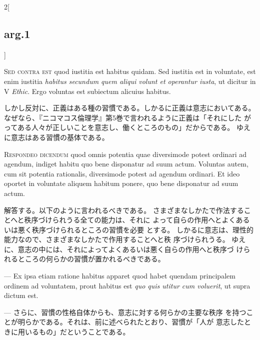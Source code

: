 \documentclass[paper=a4paper,fontsize=10pt,jafontsize=9pt,titlepage]{jlreq}
\begin{document}
\begin{paracol}{2}[\subsection{arg.1}]
\switchcolumn*[\subsection{s.c.}]

{\scshape Sed contra est} quod iustitia est habitus quidam. Sed
 iustitia est in voluntate, est enim iustitia {\itshape habitus
 secundum quem aliqui volunt et operantur iusta}, ut dicitur in V
 {\itshape Ethic}. Ergo voluntas est subiectum alicuius habitus.

\switchcolumn

しかし反対に、正義はある種の習慣である。しかるに正義は意志においてある。
 なぜなら、『ニコマコス倫理学』第5巻で言われるように正義は「それにした
 がってある人々が正しいことを意志し、働くところのもの」だからである。
 ゆえに意志はある習慣の基体である。


{\scshape Respondeo dicendum} quod omnis potentia quae diversimode potest
 ordinari ad agendum, indiget habitu quo bene disponatur ad suum
 actum. Voluntas autem, cum sit potentia rationalis, diversimode
 potest ad agendum ordinari. 
Et ideo oportet in voluntate aliquem habitum ponere, quo bene
disponatur ad suum actum.

\switchcolumn

解答する。以下のように言われるべきである。
さまざまなしかたで作法することへと秩序づけられうる全ての能力は、それに
 よって自らの作用へとよくあるいは悪く秩序づけられるところの習慣を必要
 とする。
しかるに意志は、理性的能力なので、さまざまなしかたで作用することへと秩
 序づけられうる。
ゆえに、意志の中には、それによってよくあるいは悪く自らの作用へと秩序づ
 けられるところの何らかの習慣が置かれるべきである。

\switchcolumn*

--- Ex ipsa etiam ratione habitus apparet
quod habet quendam principalem ordinem ad voluntatem, prout habitus
est {\itshape quo quis utitur cum voluerit}, ut supra dictum est.

\switchcolumn

--- さらに、習慣の性格自体からも、意志に対する何らかの主要な秩序
 を持つことが明らかである。それは、前に述べられたとおり、習慣が「人が
 意志したときに用いるもの」だということである。

\switchcolumn*[\subsection{ad.1}]


\end{paracol}
\end{document}
